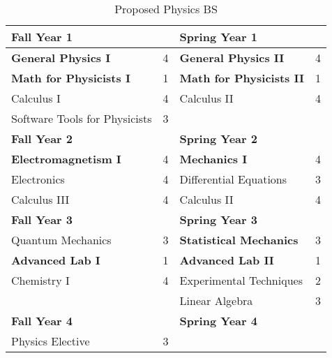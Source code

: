 \documentclass[12pt,preprint]{aastex}
\begin{document}
\begin{table}[h!]
\caption{Proposed Physics BS}
\medskip
\begin{tabular}{lclc}
\hline
{\bf Fall Year 1} &  & {\bf Spring Year 1} &  \\
\hline
\hline
{\bf General Physics I}       & 4 & {\bf General Physics II} & 4 \\
{\bf Math for Physicists I}   & 1 & {\bf Math for Physicists II} & 1 \\
Calculus I                    & 4 & Calculus II & 4 \\
Software Tools for Physicists & 3 &   &  \\
\hline
{\bf Fall Year 2} &  & {\bf Spring Year 2} &  \\
\hline
\hline
{\bf Electromagnetism I}  & 4 & {\bf Mechanics I} & 4 \\
Electronics         & 4 & Differential Equations & 3 \\
Calculus III        & 4 & Calculus II & 4 \\
\hline
{\bf Fall Year 3} &  & {\bf Spring Year 3} &  \\
\hline
\hline
Quantum Mechanics    & 3 & {\bf Statistical Mechanics} & 3 \\
{\bf Advanced Lab I} & 1 & {\bf Advanced Lab II} & 1 \\
Chemistry I          & 4 & Experimental Techniques & 2 \\
                     &   & Linear Algebra & 3 \\
\hline
{\bf Fall Year 4} &  & {\bf Spring Year 4} &  \\
\hline
\hline
Physics Elective & 3 & &  \\
\end{tabular}
\end{table}
\end{document}
